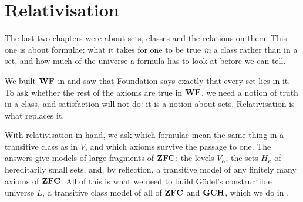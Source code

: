 \chapter{Relativisation} \label{Ch3:CH}
\thispagestyle{empty}

The last two chapters were about sets, classes and the relations on them. This one is about formulae: what it takes for one to be true \textit{in} a class rather than in a set, and how much of the universe a formula has to look at before we can tell.

We built $\mathbf{WF}$ in  and saw that Foundation says exactly that every set lies in it. To ask whether the rest of the axioms are true in $\mathbf{WF}$, we need a notion of truth in a class, and satisfaction will not do: it is a notion about sets. Relativisation is what replaces it.

With relativisation in hand, we ask which formulae mean the same thing in a transitive class as in $V$, and which axioms survive the passage to one. The answers give models of large fragments of $\mathbf{ZFC}$: the levels $V_{\alpha}$, the sets $H_{\kappa}$ of hereditarily small sets, and, by reflection, a transitive model of any finitely many axioms of $\mathbf{ZFC}$. All of this is what we need to build Gödel's constructible universe $L$, a transitive class model of all of $\mathbf{ZFC}$ and $\mathbf{GCH}$, which we do in .









